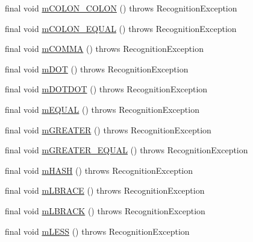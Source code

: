 \begin{DoxyCompactItemize}
\item 
final void \hyperlink{classorg_1_1tzi_1_1use_1_1parser_1_1testsuite_1_1_test_suite_lexer_af14c2378cf5c394cd4020bf6ece15f51}{m\-C\-O\-L\-O\-N\-\_\-\-C\-O\-L\-O\-N} ()  throws Recognition\-Exception 
\item 
final void \hyperlink{classorg_1_1tzi_1_1use_1_1parser_1_1testsuite_1_1_test_suite_lexer_aa6353f221a44442a9724a4f31582624a}{m\-C\-O\-L\-O\-N\-\_\-\-E\-Q\-U\-A\-L} ()  throws Recognition\-Exception 
\item 
final void \hyperlink{classorg_1_1tzi_1_1use_1_1parser_1_1testsuite_1_1_test_suite_lexer_a87ed0918ae4f5c5cbcfb236dc3fdf54f}{m\-C\-O\-M\-M\-A} ()  throws Recognition\-Exception 
\item 
final void \hyperlink{classorg_1_1tzi_1_1use_1_1parser_1_1testsuite_1_1_test_suite_lexer_aa795e531bbcda3eb7cf8399c38a4f529}{m\-D\-O\-T} ()  throws Recognition\-Exception 
\item 
final void \hyperlink{classorg_1_1tzi_1_1use_1_1parser_1_1testsuite_1_1_test_suite_lexer_a2a8472bffd54454765dd7e67ff3a8f87}{m\-D\-O\-T\-D\-O\-T} ()  throws Recognition\-Exception 
\item 
final void \hyperlink{classorg_1_1tzi_1_1use_1_1parser_1_1testsuite_1_1_test_suite_lexer_ab2a1d3e2f51cca5d5fc80b2f876725bf}{m\-E\-Q\-U\-A\-L} ()  throws Recognition\-Exception 
\item 
final void \hyperlink{classorg_1_1tzi_1_1use_1_1parser_1_1testsuite_1_1_test_suite_lexer_afa2c468f94f73baf503f6c108a9febf3}{m\-G\-R\-E\-A\-T\-E\-R} ()  throws Recognition\-Exception 
\item 
final void \hyperlink{classorg_1_1tzi_1_1use_1_1parser_1_1testsuite_1_1_test_suite_lexer_a9bc0e721c122b9de294276a293389603}{m\-G\-R\-E\-A\-T\-E\-R\-\_\-\-E\-Q\-U\-A\-L} ()  throws Recognition\-Exception 
\item 
final void \hyperlink{classorg_1_1tzi_1_1use_1_1parser_1_1testsuite_1_1_test_suite_lexer_a88326030326715324cf5a76ac337b1be}{m\-H\-A\-S\-H} ()  throws Recognition\-Exception 
\item 
final void \hyperlink{classorg_1_1tzi_1_1use_1_1parser_1_1testsuite_1_1_test_suite_lexer_a045040d05dcd69ad5291d79e619eab28}{m\-L\-B\-R\-A\-C\-E} ()  throws Recognition\-Exception 
\item 
final void \hyperlink{classorg_1_1tzi_1_1use_1_1parser_1_1testsuite_1_1_test_suite_lexer_a872236123ab5d57151e3a79535f6572f}{m\-L\-B\-R\-A\-C\-K} ()  throws Recognition\-Exception 
\item 
final void \hyperlink{classorg_1_1tzi_1_1use_1_1parser_1_1testsuite_1_1_test_suite_lexer_af74153a2dba820f5f0eada646c511f15}{m\-L\-E\-S\-S} ()  throws Recognition\-Exception 

\end{DoxyCompactItemize}
